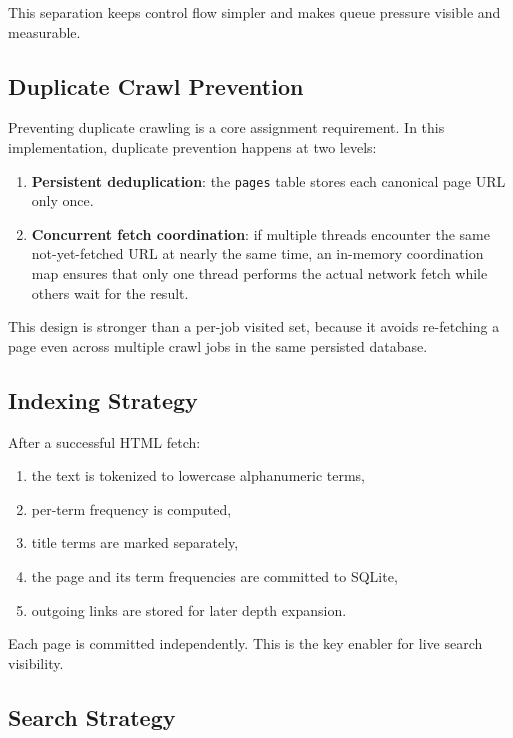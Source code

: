 \documentclass[pdftex,12pt,a4paper]{article}
\begin{document}
This separation keeps control flow simpler and makes queue pressure visible and measurable.

\subsection{Duplicate Crawl Prevention}

Preventing duplicate crawling is a core assignment requirement. In this implementation, duplicate prevention happens at two levels:

\begin{enumerate}
    \item \textbf{Persistent deduplication}: the \texttt{pages} table stores each canonical page URL only once.
    \item \textbf{Concurrent fetch coordination}: if multiple threads encounter the same not-yet-fetched URL at nearly the same time, an in-memory coordination map ensures that only one thread performs the actual network fetch while others wait for the result.
\end{enumerate}

This design is stronger than a per-job visited set, because it avoids re-fetching a page even across multiple crawl jobs in the same persisted database.

\subsection{Indexing Strategy}

After a successful HTML fetch:

\begin{enumerate}
    \item the text is tokenized to lowercase alphanumeric terms,
    \item per-term frequency is computed,
    \item title terms are marked separately,
    \item the page and its term frequencies are committed to SQLite,
    \item outgoing links are stored for later depth expansion.
\end{enumerate}

Each page is committed independently. This is the key enabler for live search visibility.

\subsection{Search Strategy}
\end{document}
